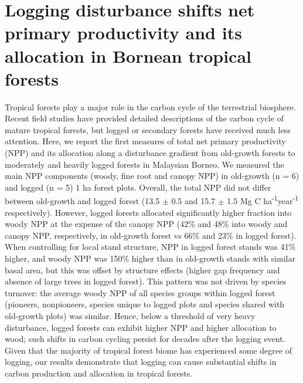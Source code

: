 \section*{Logging disturbance shifts net primary productivity and its allocation in Bornean tropical forests \citep{Riutta2018a}}

Tropical forests play a major role in the carbon cycle of the terrestrial biosphere. Recent field studies have provided detailed descriptions of the carbon cycle of mature tropical forests, but logged or secondary forests have received much less attention. Here, we report the first measures of total net primary productivity (NPP) and its allocation along a disturbance gradient from old-growth forests to moderately and heavily logged forests in Malaysian Borneo. We measured the main NPP components (woody, fine root and canopy NPP) in old-growth (n = 6) and logged (n = 5) 1 ha forest plots. Overall, the total NPP did not differ between old-growth and logged forest (13.5 $\pm$ 0.5 and 15.7  $\pm$ 1.5 Mg C ha\textsuperscript{-1}year\textsuperscript{-1} respectively). However, logged forests allocated significantly higher fraction into woody NPP at the expense of the canopy NPP (42\% and 48\% into woody and canopy NPP, respectively, in old-growth forest vs 66\% and 23\% in logged forest). When controlling for local stand structure, NPP in logged forest stands was 41\% higher, and woody NPP was 150\% higher than in old-growth stands with similar basal area, but this was offset by structure effects (higher gap frequency and absence of large trees in logged forest). This pattern was not driven by species turnover: the average woody NPP of all species groups within logged forest (pioneers, nonpioneers, species unique to logged plots and species shared with old-growth plots) was similar. Hence, below a threshold of very heavy disturbance, logged forests can exhibit higher NPP and higher allocation to wood; such shifts in carbon cycling persist for decades after the logging event. Given that the majority of tropical forest biome has experienced some degree of logging, our results demonstrate that logging can cause substantial shifts in carbon production and allocation in tropical forests.

